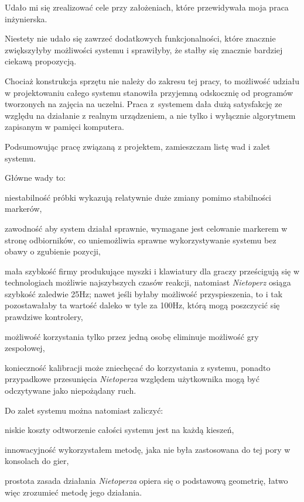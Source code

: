 \label{ch:conclusion}

Udało mi się zrealizować cele przy założeniach, które przewidywała moja praca inżynierska.

Niestety nie udało się zawrzeć dodatkowych funkcjonalności, które znacznie zwiększyłyby możliwości systemu i sprawiłyby, że stałby się znacznie bardziej ciekawą propozycją.

Chociaż konstrukcja sprzętu nie należy do zakresu tej pracy, to możliwość udziału w projektowaniu całego systemu stanowiła przyjemną odskocznię od programów tworzonych na zajęcia na uczelni. Praca z~systemem dała dużą satysfakcję ze względu na działanie z realnym urządzeniem, a nie tylko i wyłącznie algorytmem zapisanym w pamięci komputera.


Podsumowując pracę związaną z projektem, zamieszczam listę wad i zalet systemu.

Główne wady to:
\begin{aenumerate}
 \item niestabilność \ppauza próbki wykazują relatywnie duże zmiany pomimo stabilności markerów,
 \item zawodność \ppauza aby system działał sprawnie, wymagane jest celowanie markerem w stronę odbiorników, co uniemożliwia sprawne wykorzystywanie systemu bez obawy o zgubienie pozycji,
 \item mała szybkość \ppauza firmy produkujące myszki i klawiatury dla graczy prześcigują się w technologiach możliwie najszybszych czasów reakcji, natomiast \textsl{Nietoperz} osiąga szybkość zaledwie 25Hz; nawet jeśli byłaby możliwość przyspieszenia, to i tak pozostawałaby ta wartość daleko w tyle za 100Hz, którą mogą poszczycić się prawdziwe kontrolery,
 \item możliwość korzystania tylko przez jedną osobę \ppauza eliminuje możliwość gry zespołowej,
 \item konieczność kalibracji \ppauza może zniechęcać do korzystania z systemu, ponadto przypadkowe przesunięcia \textsl{Nietoperza} względem użytkownika mogą być odczytywane jako niepożądany ruch.
\end{aenumerate}

Do zalet systemu można natomiast zaliczyć:
\begin{aenumerate}
 \item niskie koszty \ppauza odtworzenie całości systemu jest na każdą kieszeń,
 \item innowacyjność \ppauza wykorzystałem metodę, jaka nie była zastosowana do tej pory w konsolach do gier,
 \item prostota \ppauza zasada działania \textsl{Nietoperza} opiera się o podstawową geometrię, łatwo więc zrozumieć metodę jego działania.
\end{aenumerate}

